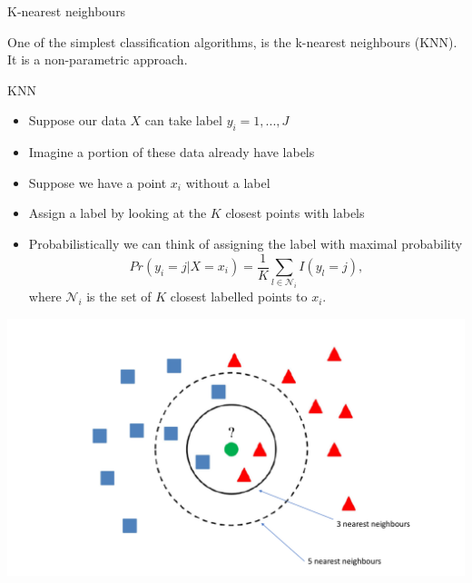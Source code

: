 \documentclass{bredelebeamer}
\begin{document}
\begin{frame}{K-nearest neighbours}

One of the simplest classification algorithms, is the k-nearest neighbours (KNN). It is a non-parametric approach.
\begin{exampleblock}{KNN}
	
	\begin{itemize}
		
		\item Suppose our data $X$ can take label $y_i = 1,..., J$
		\item Imagine a portion of these data already have labels
		\item Suppose we have a point $x_i$ without a label
		\item Assign a label by looking at the $K$ closest points with labels
		\item Probabilistically we can think of assigning the label with maximal probability
		\begin{equation}
		Pr(y_i = j|X = x_i) = \frac{1}{K}\sum_{l \in \mathcal{N}_i}I(y_l = j),
		\end{equation}
		where $\mathcal{N}_i$ is the set of $K$ closest labelled points to $x_i$.
		
	\end{itemize}
\end{exampleblock}

\end{frame}



\begin{frame}

\includegraphics[width = 1\textwidth]{knn}

\end{frame}
\end{document}
